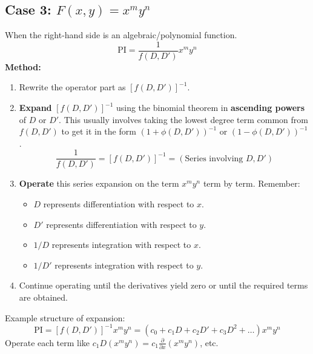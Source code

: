 \documentclass{article}
\theoremstyle{remark}
\begin{document}
	\subsection{Case 3: $F(x, y) = x^m y^n$}
	When the right-hand side is an algebraic/polynomial function.
	\[
	\text{PI} = \frac{1}{f(D, D')} x^m y^n
	\]
	\textbf{Method:}
	\begin{enumerate}
		\item Rewrite the operator part as $[f(D, D')]^{-1}$.
		\item \textbf{Expand} $[f(D, D')]^{-1}$ using the binomial theorem in \textbf{ascending powers} of $D$ or $D'$. This usually involves taking the lowest degree term common from $f(D, D')$ to get it in the form $(1 + \phi(D, D'))^{-1}$ or $(1 - \phi(D, D'))^{-1}$.
		\[
		\frac{1}{f(D, D')} = [f(D, D')]^{-1} = (\text{Series involving } D, D')
		\]
		\item \textbf{Operate} this series expansion on the term $x^m y^n$ term by term. Remember:
		\begin{itemize}
			\item $D$ represents differentiation with respect to $x$.
			\item $D'$ represents differentiation with respect to $y$.
			\item $1/D$ represents integration with respect to $x$.
			\item $1/D'$ represents integration with respect to $y$.
		\end{itemize}
		\item Continue operating until the derivatives yield zero or until the required terms are obtained.
	\end{enumerate}
	Example structure of expansion:
	\[
	\text{PI} = [f(D, D')]^{-1} x^m y^n = (c_0 + c_1 D + c_2 D' + c_3 D^2 + \dots) x^m y^n
	\]
	Operate each term like $c_1 D(x^m y^n) = c_1 \frac{\partial}{\partial x}(x^m y^n)$, etc.
	
\end{document}
